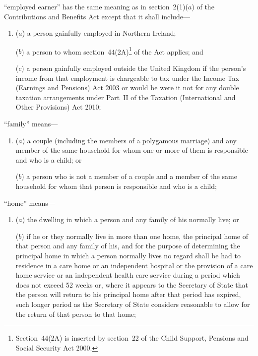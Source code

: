 \documentclass[12pt,a4paper]{article}
\begin{document}
\begin{enumerate}
“employed earner” has the same meaning as in section~2(1)($a$)  of the Contributions and Benefits Act except that it shall include—
\begin{enumerate}\item[]
($a$) 
a person gainfully employed in Northern Ireland; 

($b$) 
a person to whom section~44(2A)\footnote{Section~44(2A) is inserted by section~22 of the Child Support, Pensions and Social Security Act 2000.} of the Act applies;
and %

($c$) a person gainfully employed outside the United Kingdom if the person’s income from that employment is chargeable to tax under the Income Tax (Earnings and Pensions) Act 2003 or would be were it not for any double taxation arrangements under Part~II of the Taxation (International and Other Provisions) Act 2010;
\end{enumerate}

“family” means—
\begin{enumerate}\item[]
($a$) 
a couple (including the members of a polygamous marriage) and any member of the same household for whom one or more of them is responsible and who is a child; or

($b$) 
a person who is not a member of a couple and a member of the same household for whom that person is responsible and who is a child;
\end{enumerate}

“home” means—
\begin{enumerate}\item[]
($a$) 
the dwelling in which a person and any family of his normally live; or

($b$) 
if he or they normally live in more than one home, the principal home of that person and any family of his, and for the purpose of determining the principal home in which a person normally lives no regard shall be had to residence in 
a care home or an independent hospital or the provision of a care home service or an independent health care service  %
during a period which does not exceed 52 weeks or, where it appears to the Secretary of State that the person will return to his principal home after that period has expired, such longer period as the Secretary of State considers reasonable to allow for the return of that person to that home;
\end{enumerate}


\end{enumerate}
\end{document}
